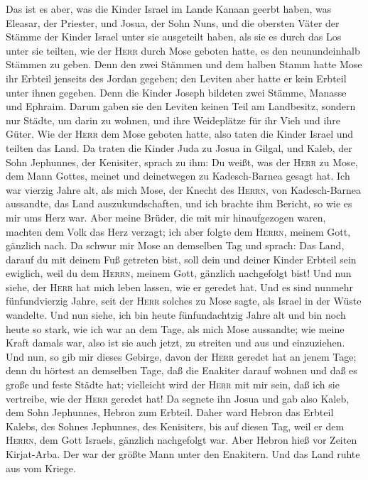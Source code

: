  Das ist es aber, was die Kinder Israel im Lande Kanaan
geerbt haben, was Eleasar, der Priester, und Josua, der Sohn Nuns, und
die obersten Väter der Stämme der Kinder Israel unter sie ausgeteilt
haben,  als sie es durch das Los unter sie teilten, wie
der \textsc{Herr} durch Mose geboten hatte, es den neunundeinhalb
Stämmen zu geben.  Denn den zwei Stämmen und dem halben
Stamm hatte Mose ihr Erbteil jenseits des Jordan gegeben; den Leviten
aber hatte er kein Erbteil unter ihnen gegeben.  Denn die
Kinder Joseph bildeten zwei Stämme, Manasse und Ephraim. Darum gaben sie
den Leviten keinen Teil am Landbesitz, sondern nur Städte, um darin zu
wohnen, und ihre Weideplätze für ihr Vieh und ihre Güter. 
Wie der \textsc{Herr} dem Mose geboten hatte, also taten die Kinder
Israel und teilten das Land.  Da traten die Kinder Juda zu
Josua in Gilgal, und Kaleb, der Sohn Jephunnes, der Kenisiter, sprach zu
ihm: Du weißt, was der \textsc{Herr} zu Mose, dem Mann Gottes, meinet
und deinetwegen zu Kadesch-Barnea gesagt hat.  Ich war
vierzig Jahre alt, als mich Mose, der Knecht des \textsc{Herrn}, von
Kadesch-Barnea aussandte, das Land auszukundschaften, und ich brachte
ihm Bericht, so wie es mir ums Herz war.  Aber meine
Brüder, die mit mir hinaufgezogen waren, machten dem Volk das Herz
verzagt; ich aber folgte dem \textsc{Herrn}, meinem Gott, gänzlich nach.
 Da schwur mir Mose an demselben Tag und sprach: Das Land,
darauf du mit deinem Fuß getreten bist, soll dein und deiner Kinder
Erbteil sein ewiglich, weil du dem \textsc{Herrn}, meinem Gott, gänzlich
nachgefolgt bist!  Und nun siehe, der \textsc{Herr} hat
mich leben lassen, wie er geredet hat. Und es sind nunmehr
fünfundvierzig Jahre, seit der \textsc{Herr} solches zu Mose sagte, als
Israel in der Wüste wandelte. Und nun siehe, ich bin heute
fünfundachtzig Jahre alt  und bin noch heute so stark,
wie ich war an dem Tage, als mich Mose aussandte; wie meine Kraft damals
war, also ist sie auch jetzt, zu streiten und aus und einzuziehen.
 Und nun, so gib mir dieses Gebirge, davon der
\textsc{Herr} geredet hat an jenem Tage; denn du hörtest an demselben
Tage, daß die Enakiter darauf wohnen und daß es große und feste Städte
hat; vielleicht wird der \textsc{Herr} mit mir sein, daß ich sie
vertreibe, wie der \textsc{Herr} geredet hat!  Da segnete
ihn Josua und gab also Kaleb, dem Sohn Jephunnes, Hebron zum Erbteil.
 Daher ward Hebron das Erbteil Kalebs, des Sohnes
Jephunnes, des Kenisiters, bis auf diesen Tag, weil er dem
\textsc{Herrn}, dem Gott Israels, gänzlich nachgefolgt war.
 Aber Hebron hieß vor Zeiten Kirjat-Arba. Der war der
größte Mann unter den Enakitern. Und das Land ruhte aus vom Kriege.

